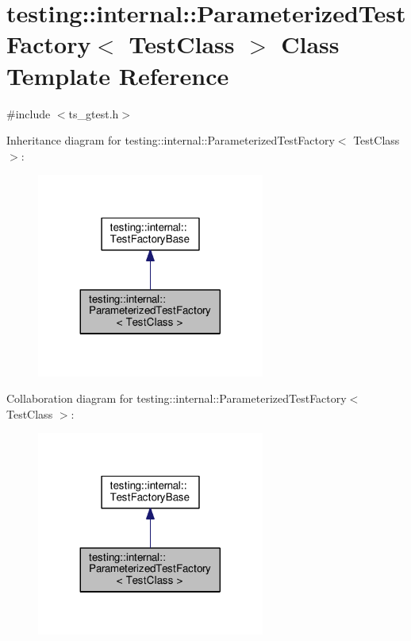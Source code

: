 \hypertarget{classtesting_1_1internal_1_1ParameterizedTestFactory}{\section{testing\-:\-:internal\-:\-:Parameterized\-Test\-Factory$<$ Test\-Class $>$ Class Template Reference}
\label{classtesting_1_1internal_1_1ParameterizedTestFactory}
}


{\ttfamily \#include $<$ts\-\_\-gtest.\-h$>$}



Inheritance diagram for testing\-:\-:internal\-:\-:Parameterized\-Test\-Factory$<$ Test\-Class $>$\-:\nopagebreak
\begin{figure}[H]
\begin{center}
\leavevmode
\includegraphics[width=212pt]{classtesting_1_1internal_1_1ParameterizedTestFactory__inherit__graph}
\end{center}
\end{figure}


Collaboration diagram for testing\-:\-:internal\-:\-:Parameterized\-Test\-Factory$<$ Test\-Class $>$\-:\nopagebreak
\begin{figure}[H]
\begin{center}
\leavevmode
\includegraphics[width=212pt]{classtesting_1_1internal_1_1ParameterizedTestFactory__coll__graph}
\end{center}
\end{figure}
